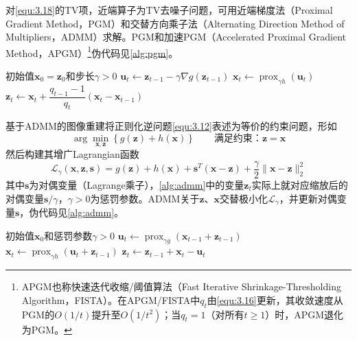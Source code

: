 \documentclass[12pt]{article}
\begin{document}
对\autoref{equ:3.18}的TV项，近端算子为TV去噪子问题，可用近端梯度法（Proximal Gradient Method，PGM）\label{term:PGM}和交替方向乘子法（Alternating Direction Method of Multipliers，ADMM）\label{term:ADMM}求解。PGM和加速PGM（Accelerated Proximal Gradient Method，APGM）\label{term:APGM}\footnote{APGM也称快速迭代收缩/阈值算法（Fast Iterative Shrinkage-Thresholding Algorithm，FISTA）\label{term:FISTA}。在APGM/FISTA中$q_t$由\autoref{equ:3.16}更新，其收敛速度从PGM的$O(1/t)$提升至$O(1/t^2)$；当$q_t=1$（对所有$t\geq 1$）时，APGM退化为PGM。}伪代码见\autoref{alg:pgm}。
\begin{algorithm}[ht]
    \small
    \caption{PGM/APGM}
    \label{alg:pgm}
    \begin{algorithmic}[1]
        \Require 初始值$\bm{x}_0=\bm{z}_0$和步长$\gamma>0$
            \State $\bm{u}_t\gets\bm{z}_{t-1}-\gamma\nabla g(\bm{z}_{t-1})$ 
            \State $\bm{x}_t\gets\operatorname{prox}_{\gamma h}(\bm{u}_t)$ 
            \State $\bm{z}_t\gets\bm{x}_t+\dfrac{q_{t-1}-1}{q_t}(\bm{x}_t-\bm{x}_{t-1})$ 
        \EndFor
    \end{algorithmic}
\end{algorithm}
基于ADMM的图像重建将正则化逆问题\autoref{equ:3.12}表述为等价的约束问题，形如
\begin{equation}
    \arg\min_{\bm{x},\bm{z}}\left\{g(\bm{z})+h(\bm{x})\right\}\qquad\text{满足约束：}\bm{z}=\bm{x}
    \label{equ:3.20}
\end{equation}
然后构建其增广Lagrangian函数
\begin{equation}
    \mathcal{L}_\gamma(\bm{x},\bm{z},\bm{s})=g(\bm{z})+h(\bm{x})+\bm{s}^T(\bm{x}-\bm{z})+\frac{\gamma}{2}\|\bm{x}-\bm{z}\|_2^2
\end{equation}
其中$\bm{s}$为对偶变量（Lagrange乘子），\autoref{alg:admm}中的变量$\bm{z}_t$实际上就对应缩放后的对偶变量$\bm{s}/\gamma$，$\gamma>0$为惩罚参数。ADMM关于$\bm{z}$、$\bm{x}$交替极小化$\mathcal{L}_\gamma$，并更新对偶变量$\bm{s}$，伪代码见\autoref{alg:admm}。
\begin{algorithm}[ht]
    \small
    \caption{ADMM}
    \label{alg:admm}
    \begin{algorithmic}[1]
        \Require 初始值$\bm{x}_0$和惩罚参数$\gamma>0$
            \State $\bm{u}_t\gets\operatorname{prox}_{\gamma g}(\bm{x}_{t-1}+\bm{z}_{t-1})$ 
            \State $\bm{x}_t\gets\operatorname{prox}_{\gamma h}(\bm{u}_t+\bm{z}_{t-1})$ 
            \State $\bm{z}_t\gets\bm{z}_{t-1}+\bm{x}_t-\bm{u}_t$
        \EndFor
    \end{algorithmic}
\end{algorithm}
\end{document}
